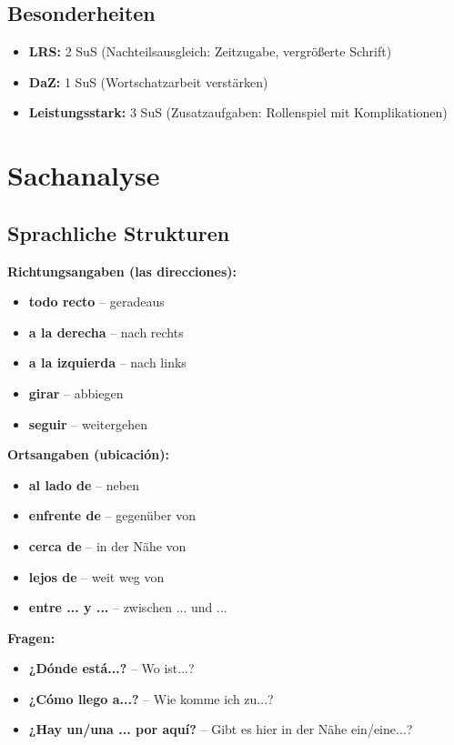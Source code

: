 \documentclass[11pt,a4paper]{article}
\begin{document}
\subsection{Besonderheiten}
\begin{itemize}
    \item \textbf{LRS:} 2 SuS (Nachteilsausgleich: Zeitzugabe, vergrößerte Schrift)
    \item \textbf{DaZ:} 1 SuS (Wortschatzarbeit verstärken)
    \item \textbf{Leistungsstark:} 3 SuS (Zusatzaufgaben: Rollenspiel mit Komplikationen)
\end{itemize}

\section{Sachanalyse}

\subsection{Sprachliche Strukturen}

\textbf{Richtungsangaben (las direcciones):}
\begin{itemize}
    \item \textbf{todo recto} -- geradeaus
    \item \textbf{a la derecha} -- nach rechts
    \item \textbf{a la izquierda} -- nach links
    \item \textbf{girar} -- abbiegen
    \item \textbf{seguir} -- weitergehen
\end{itemize}

\textbf{Ortsangaben (ubicación):}
\begin{itemize}
    \item \textbf{al lado de} -- neben
    \item \textbf{enfrente de} -- gegenüber von
    \item \textbf{cerca de} -- in der Nähe von
    \item \textbf{lejos de} -- weit weg von
    \item \textbf{entre ... y ...} -- zwischen ... und ...
\end{itemize}

\textbf{Fragen:}
\begin{itemize}
    \item \textbf{¿Dónde está...?} -- Wo ist...?
    \item \textbf{¿Cómo llego a...?} -- Wie komme ich zu...?
    \item \textbf{¿Hay un/una ... por aquí?} -- Gibt es hier in der Nähe ein/eine...?
\end{itemize}
\end{document}
